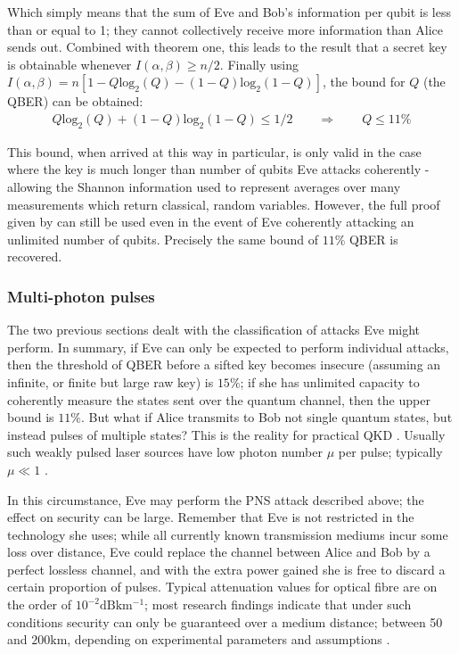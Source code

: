 \documentclass[paper=a4, fontsize=11pt]{scrartcl} %
\numberwithin{equation}{section} %
\numberwithin{figure}{section} %
\numberwithin{table}{section} %
\begin{document}
Which simply means that the sum of Eve and Bob's information per qubit is
less than or equal to 1; they cannot collectively receive more information
than Alice sends out. Combined with theorem one, this leads to the result that
a secret key is obtainable whenever $I(\alpha, \beta) \geq n/2$.
Finally using $I(\alpha, \beta) = n\left[1-Q\mathrm{log}_2(Q) - (1-Q)\mathrm{log}_2(1-Q)\right]$,
the bound for $Q$ (the QBER) can be obtained:
\begin{align}
	Q\mathrm{log}_2(Q) + (1-Q)\mathrm{log}_2(1-Q) \leq 1/2
	\qquad
	\Rightarrow
	\qquad
	Q \leq 11\%
\end{align}

This bound, when arrived at this way in particular, is only valid in the case where the key is much longer than number of
qubits Eve attacks coherently - allowing the Shannon information used to represent averages over
many measurements which return classical, random variables. However, the full proof given by
\citet{proofBB84} can still be used even in the event of Eve coherently attacking an unlimited number
of qubits. Precisely the same bound of $11\%$ QBER is recovered.

\subsubsection*{Multi-photon pulses}
The two previous sections dealt with the classification of attacks Eve might perform. In summary, if Eve can only be
expected to perform individual attacks, then the threshold of QBER before a sifted key becomes insecure
(assuming an infinite, or finite but large raw key) is $15\%$; if she has unlimited capacity to coherently measure
the states sent over the quantum channel, then the upper bound is $11\%$. But what if Alice transmits to Bob
not single quantum states, but instead pulses of multiple states? This is the reality for practical QKD \citep{recentDecoy, huttner1995}.
Usually such weakly pulsed laser sources have low photon number $\mu$ per pulse; typically $\mu \ll 1$ \citep{reviewScariani}.

In this circumstance, Eve may perform the PNS attack described above; the effect on security can be large.
Remember that Eve is not restricted in the technology she uses; while all currently known transmission
mediums incur some loss over distance, Eve could replace the channel between Alice and Bob by a perfect
lossless channel, and with the extra power gained she is free to discard a certain proportion of pulses. Typical
attenuation values for optical fibre are on the order of $10^{-2} \si{\dB \km^{-1}}$; most research findings indicate that
under such conditions security can only be guaranteed over a medium distance; between 50 and $200\si{\km}$, depending on experimental
parameters and assumptions \citep{perf2protocols, satellites, experimentalComparison}.
\end{document}
